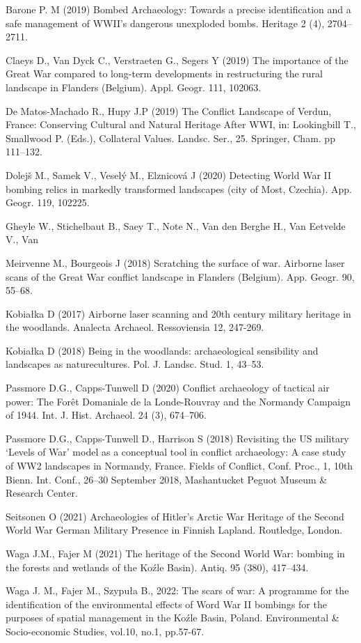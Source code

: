 {Barone P. M (2019) Bombed Archaeology: Towards a precise identification and a safe management of WWII’s dangerous unexploded bombs. Heritage 2 (4), 2704–2711.

Claeys D., Van Dyck C., Verstraeten G., Segers Y (2019) The importance of the Great War compared to long-term developments in restructuring the rural landscape in Flanders (Belgium). Appl. Geogr. 111, 102063.

De Matos-Machado R., Hupy J.P (2019) The Conflict Landscape of Verdun, France: Conserving Cultural and Natural Heritage After WWI, in: Lookingbill T., Smallwood P.  (Eds.), Collateral Values. Landsc. Ser., 25. Springer, Cham. pp 111–132.

Dolejš M., Samek V., Veselý M., Elznicová J (2020) Detecting World War II bombing relics in markedly transformed landscapes (city of Most, Czechia). App. Geogr. 119, 102225.

Gheyle W., Stichelbaut B., Saey T., Note N., Van den Berghe H., Van Eetvelde V., Van 

Meirvenne M., Bourgeois J (2018) Scratching the surface of war. Airborne laser scans of the Great War conflict landscape in Flanders (Belgium). App. Geogr. 90, 55–68.

Kobiałka D (2017) Airborne laser scanning and 20th century military heritage in the woodlands. Analecta Archaeol. Ressoviensia 12, 247-269.

Kobiałka D (2018) Being in the woodlands: archaeological sensibility and landscapes as naturecultures. Pol. J. Landsc. Stud. 1, 43–53.

Passmore D.G., Capps-Tunwell D (2020) Conflict archaeology of tactical air power: The Forêt Domaniale de la Londe-Rouvray and the Normandy Campaign of 1944. Int. J. Hist. Archaeol. 24 (3), 674–706.

Passmore D.G., Capps-Tunwell D., Harrison S (2018) Revisiting the US military ‘Levels of War’ model as a conceptual tool in conflict archaeology: A case study of WW2 landscapes in Normandy, France. Fields of Conflict, Conf. Proc., 1, 10th Bienn. Int. Conf., 26–30 September 2018, Mashantucket Peguot Museum \& Research Center.

Seitsonen O (2021) Archaeologies of Hitler’s Arctic War Heritage of the Second World War German Military Presence in Finnish Lapland. Routledge, London.

Waga J.M., Fajer M (2021) The heritage of the Second World War: bombing in the forests and wetlands of the Koźle Basin). Antiq. 95 (380), 417–434.

Waga J. M., Fajer M., Szypuła B., 2022: The scars of war: A programme for the identification of the environmental effects of Word War II bombings for the purposes of spatial management in the Koźle Basin, Poland. Environmental \& Socio-economic Studies, vol.10, no.1, pp.57-67. 
}

